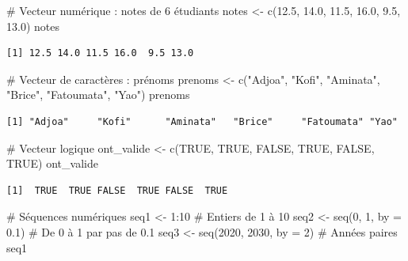 \documentclass[
  french,
  11pt,
  a4paper,
]{article}
\newenvironment{Shaded}{}{}
\newcommand{\AttributeTok}[1]{\textcolor[rgb]{0.84,0.23,0.29}{#1}}
\newcommand{\CommentTok}[1]{\textcolor[rgb]{0.42,0.45,0.49}{#1}}
\newcommand{\ConstantTok}[1]{\textcolor[rgb]{0.00,0.36,0.77}{#1}}
\newcommand{\DecValTok}[1]{\textcolor[rgb]{0.00,0.36,0.77}{#1}}
\newcommand{\FloatTok}[1]{\textcolor[rgb]{0.00,0.36,0.77}{#1}}
\newcommand{\FunctionTok}[1]{\textcolor[rgb]{0.44,0.26,0.76}{#1}}
\newcommand{\NormalTok}[1]{\textcolor[rgb]{0.14,0.16,0.18}{#1}}
\newcommand{\OtherTok}[1]{\textcolor[rgb]{0.44,0.26,0.76}{#1}}
\newcommand{\SpecialCharTok}[1]{\textcolor[rgb]{0.00,0.36,0.77}{#1}}
\newcommand{\StringTok}[1]{\textcolor[rgb]{0.01,0.18,0.38}{#1}}
\begin{document}
\begin{Shaded}
\begin{Highlighting}[]
\CommentTok{\# Vecteur numérique : notes de 6 étudiants}
\NormalTok{notes }\OtherTok{\textless{}{-}} \FunctionTok{c}\NormalTok{(}\FloatTok{12.5}\NormalTok{, }\FloatTok{14.0}\NormalTok{, }\FloatTok{11.5}\NormalTok{, }\FloatTok{16.0}\NormalTok{, }\FloatTok{9.5}\NormalTok{, }\FloatTok{13.0}\NormalTok{)}
\NormalTok{notes}
\end{Highlighting}
\end{Shaded}

\begin{verbatim}
[1] 12.5 14.0 11.5 16.0  9.5 13.0
\end{verbatim}

\begin{Shaded}
\begin{Highlighting}[]
\CommentTok{\# Vecteur de caractères : prénoms}
\NormalTok{prenoms }\OtherTok{\textless{}{-}} \FunctionTok{c}\NormalTok{(}\StringTok{"Adjoa"}\NormalTok{, }\StringTok{"Kofi"}\NormalTok{, }\StringTok{"Aminata"}\NormalTok{, }\StringTok{"Brice"}\NormalTok{, }\StringTok{"Fatoumata"}\NormalTok{, }\StringTok{"Yao"}\NormalTok{)}
\NormalTok{prenoms}
\end{Highlighting}
\end{Shaded}

\begin{verbatim}
[1] "Adjoa"     "Kofi"      "Aminata"   "Brice"     "Fatoumata" "Yao"      
\end{verbatim}

\begin{Shaded}
\begin{Highlighting}[]
\CommentTok{\# Vecteur logique}
\NormalTok{ont\_valide }\OtherTok{\textless{}{-}} \FunctionTok{c}\NormalTok{(}\ConstantTok{TRUE}\NormalTok{, }\ConstantTok{TRUE}\NormalTok{, }\ConstantTok{FALSE}\NormalTok{, }\ConstantTok{TRUE}\NormalTok{, }\ConstantTok{FALSE}\NormalTok{, }\ConstantTok{TRUE}\NormalTok{)}
\NormalTok{ont\_valide}
\end{Highlighting}
\end{Shaded}

\begin{verbatim}
[1]  TRUE  TRUE FALSE  TRUE FALSE  TRUE
\end{verbatim}

\begin{Shaded}
\begin{Highlighting}[]
\CommentTok{\# Séquences numériques}
\NormalTok{seq1 }\OtherTok{\textless{}{-}} \DecValTok{1}\SpecialCharTok{:}\DecValTok{10}           \CommentTok{\# Entiers de 1 à 10}
\NormalTok{seq2 }\OtherTok{\textless{}{-}} \FunctionTok{seq}\NormalTok{(}\DecValTok{0}\NormalTok{, }\DecValTok{1}\NormalTok{, }\AttributeTok{by =} \FloatTok{0.1}\NormalTok{)   }\CommentTok{\# De 0 à 1 par pas de 0.1}
\NormalTok{seq3 }\OtherTok{\textless{}{-}} \FunctionTok{seq}\NormalTok{(}\DecValTok{2020}\NormalTok{, }\DecValTok{2030}\NormalTok{, }\AttributeTok{by =} \DecValTok{2}\NormalTok{)  }\CommentTok{\# Années paires}
\NormalTok{seq1}
\end{Highlighting}
\end{Shaded}
\end{document}
